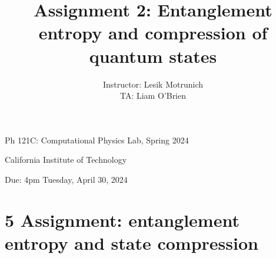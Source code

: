 \documentclass[12pt]{article}
\title{Assignment 2: Entanglement entropy and compression of quantum states }
\author{Instructor: Lesik Motrunich\\
TA: Liam O'Brien}
\date{}
\begin{document}
\maketitle
Ph 121C: Computational Physics Lab, Spring 2024

California Institute of Technology

Due: 4pm Tuesday, April 30, 2024









\section*{5 Assignment: entanglement entropy and state compression}
\end{document}
